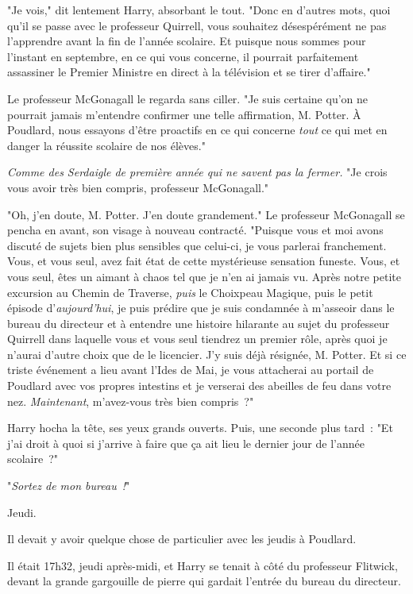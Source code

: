 "Je vois," dit lentement Harry, absorbant le tout. "Donc en d'autres mots, quoi qu'il se passe avec le professeur Quirrell, vous souhaitez désespérément ne pas l'apprendre avant la fin de l'année scolaire. Et puisque nous sommes pour l'instant en septembre, en ce qui vous concerne, il pourrait parfaitement assassiner le Premier Ministre en direct à la télévision et se tirer d'affaire."

Le professeur McGonagall le regarda sans ciller. "Je suis certaine qu'on ne pourrait jamais m'entendre confirmer une telle affirmation, M. Potter. À Poudlard, nous essayons d'être proactifs en ce qui concerne \emph{tout} ce qui met en danger la réussite scolaire de nos élèves."

\emph{Comme des Serdaigle de première année qui ne savent pas la fermer.} "Je crois vous avoir très bien compris, professeur McGonagall."

"Oh, j'en doute, M. Potter. J'en doute grandement." Le professeur McGonagall se pencha en avant, son visage à nouveau contracté. "Puisque vous et moi avons discuté de sujets bien plus sensibles que celui-ci, je vous parlerai franchement. Vous, et vous seul, avez fait état de cette mystérieuse sensation funeste. Vous, et vous seul, êtes un aimant à chaos tel que je n'en ai jamais vu. Après notre petite excursion au Chemin de Traverse, \emph{puis} le Choixpeau Magique, puis le petit épisode d'\emph{aujourd'hui}, je puis prédire que je suis condamnée à m'asseoir dans le bureau du directeur et à entendre une histoire hilarante au sujet du professeur Quirrell dans laquelle vous et vous seul tiendrez un premier rôle, après quoi je n'aurai d'autre choix que de le licencier. J'y suis déjà résignée, M. Potter. Et si ce triste événement a lieu avant l'Ides de Mai, je vous attacherai au portail de Poudlard avec vos propres intestins et je verserai des abeilles de feu dans votre nez. \emph{Maintenant}, m'avez-vous très bien compris~?"

Harry hocha la tête, ses yeux grands ouverts. Puis, une seconde plus tard~: "Et j'ai droit à quoi si j'arrive à faire que ça ait lieu le dernier jour de l'année scolaire~?"

"\emph{Sortez de mon bureau~!}"

\later

Jeudi.

Il devait y avoir quelque chose de particulier avec les jeudis à Poudlard.

Il était 17h32, jeudi après-midi, et Harry se tenait à côté du professeur Flitwick, devant la grande gargouille de pierre qui gardait l'entrée du bureau du directeur.

